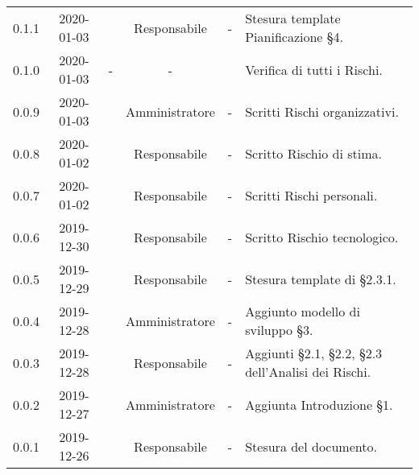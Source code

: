 {\begin{longtable}{ c c  C{2.3cm} c C{3cm} C{3.2cm}}
0.1.1 & 2020-01-03 & \SE{} & Responsabile & - & Stesura template Pianificazione §4. \\
0.1.0 & 2020-01-03 & - & - & \AT{} & Verifica di tutti i Rischi. \\
0.0.9 & 2020-01-03 & \LD{} & Amministratore & - & Scritti Rischi organizzativi. \\
0.0.8 & 2020-01-02 & \SE{} & Responsabile & - & Scritto Rischio di stima. \\
0.0.7 & 2020-01-02 & \SE{} & Responsabile & - & Scritti Rischi personali. \\
0.0.6 & 2019-12-30 & \SE{} & Responsabile & - & Scritto Rischio tecnologico. \\
0.0.5 & 2019-12-29 & \SE{} & Responsabile & - & Stesura template di §2.3.1. \\
0.0.4 & 2019-12-28 & \LD{} & Amministratore & - & Aggiunto modello di sviluppo §3. \\
0.0.3 & 2019-12-28 & \SE{} & Responsabile & - & Aggiunti §2.1, §2.2, §2.3 dell'Analisi dei Rischi. \\
0.0.2 & 2019-12-27 & \LD{} & Amministratore & - & Aggiunta Introduzione §1. \\
0.0.1 & 2019-12-26 & \SE{} & Responsabile & - & Stesura del documento. \\
		
\end{longtable}
}